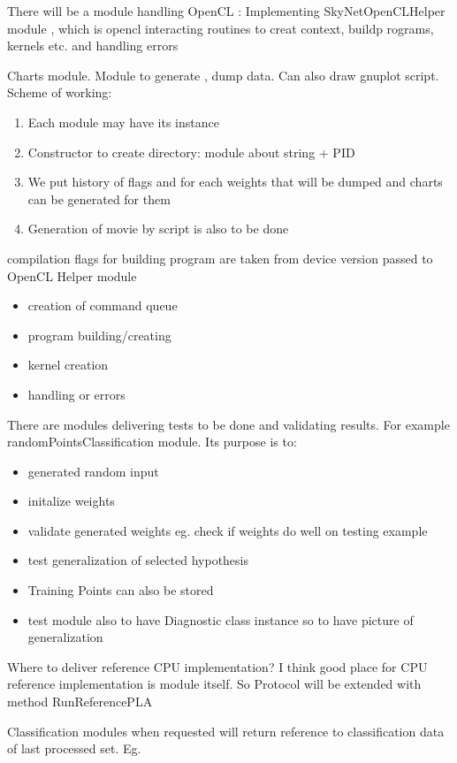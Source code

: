 \documentclass[a4paper,10pt]{article}
\begin{document}
There will be a module handling OpenCL :
Implementing SkyNetOpenCLHelper module , which is opencl interacting routines to creat context, buildp rograms, kernels etc. and handling errors


Charts module. Module to generate , dump data. Can also draw gnuplot script.
Scheme of working:
\begin{enumerate}
\item Each module may have its instance
\item Constructor to create directory: module about string + PID
\item We put history of flags and for each weights that will be dumped and charts can be generated for them
\item Generation of movie by script is also to be done
\end{enumerate}

compilation flags for building program are taken from device version passed to OpenCL Helper module




\begin{itemize}
\item creation of command queue
\item program building/creating
\item kernel creation
\item handling or errors
\end{itemize}

There are modules delivering tests to be done and validating results.
For example randomPointsClassification module. Its purpose is to:
\begin{itemize}
\item generated random input
\item initalize weights
\item validate generated weights eg. check if weights do well on testing example
\item test generalization of selected hypothesis 
\item Training Points can also be stored
\item test module also to have Diagnostic class instance so to have picture of generalization
\end{itemize}

Where to deliver reference CPU implementation? I think good place for CPU reference implementation is module itself.
So Protocol will be extended with method RunReferencePLA

Classification modules when requested will return reference to classification data of last processed set. Eg.
\end{document}
